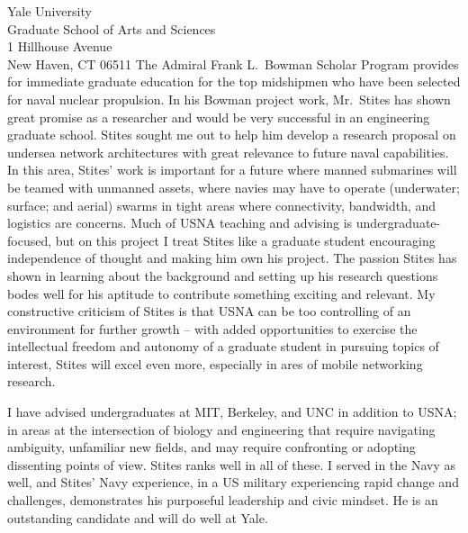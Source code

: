 \documentclass[10pt]{wrceletter}
\begin{document}
\begin{letter}{%
Yale University\\
Graduate School of Arts and Sciences\\
1 Hillhouse Avenue\\
New Haven, CT 06511}
The Admiral Frank L.~Bowman Scholar Program provides for immediate graduate education for the top midshipmen who have been selected for naval nuclear propulsion. In his Bowman project work, Mr.~Stites has shown great promise as a researcher and would be very successful in an engineering graduate school. Stites sought me out to help him develop a research proposal on undersea network architectures with great relevance to future naval capabilities. In this area, Stites' work is important for a future where manned submarines will be teamed with unmanned assets, where navies may have to operate (underwater; surface; and aerial) swarms in tight areas where connectivity, bandwidth, and logistics are concerns. Much of USNA teaching and advising is undergraduate-focused, but on this project I treat Stites like a graduate student encouraging independence of thought and making him own his project. The passion Stites has shown in learning about the background and setting up his research questions bodes well for his aptitude to contribute something exciting and relevant. My constructive criticism of Stites is that USNA can be too controlling of an environment for further growth -- with added opportunities to exercise the intellectual freedom and autonomy of a graduate student in pursuing topics of interest, Stites will excel even more, especially in ares of mobile networking research.

I have advised undergraduates at MIT, Berkeley, and UNC in addition to USNA; in areas at the intersection of biology and engineering that require navigating ambiguity, unfamiliar new fields, and may require confronting or adopting dissenting points of view. Stites ranks well in all of these. I served in the Navy as well, and Stites' Navy experience, in a US military experiencing rapid change and challenges, demonstrates his purposeful leadership and civic mindset. He is an outstanding candidate and will do well at Yale.

\closing{~} %

\end{letter}
\end{document}
